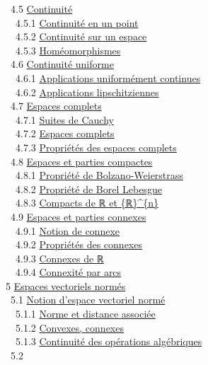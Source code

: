 \documentclass[]{article}
\begin{document}
~4.5 \href{coursse22.html\#x29-1470004.5}{Continuité} \\ ~~4.5.1
\href{coursse22.html\#x29-1480004.5.1}{Continuité en un point} \\
~~4.5.2 \href{coursse22.html\#x29-1490004.5.2}{Continuité sur un espace}
\\ ~~4.5.3 \href{coursse22.html\#x29-1500004.5.3}{Homéomorphismes} \\
~4.6 \href{coursse23.html\#x30-1510004.6}{Continuité uniforme} \\
~~4.6.1 \href{coursse23.html\#x30-1520004.6.1}{Applications uniformément
continues} \\ ~~4.6.2
\href{coursse23.html\#x30-1530004.6.2}{Applications lipschitziennes} \\
~4.7 \href{coursse24.html\#x31-1540004.7}{Espaces complets} \\ ~~4.7.1
\href{coursse24.html\#x31-1550004.7.1}{Suites de Cauchy} \\ ~~4.7.2
\href{coursse24.html\#x31-1560004.7.2}{Espaces complets} \\ ~~4.7.3
\href{coursse24.html\#x31-1570004.7.3}{Propriétés des espaces complets}
\\ ~4.8 \href{coursse25.html\#x32-1580004.8}{Espaces et parties
compactes} \\ ~~4.8.1 \href{coursse25.html\#x32-1590004.8.1}{Propriété
de Bolzano-Weierstrass} \\ ~~4.8.2
\href{coursse25.html\#x32-1600004.8.2}{Propriété de Borel Lebesgue} \\
~~4.8.3 \href{coursse25.html\#x32-1610004.8.3}{Compacts de ℝ et
\{ℝ\}\^{}\{n\}} \\ ~4.9 \href{coursse26.html\#x33-1620004.9}{Espaces et
parties connexes} \\ ~~4.9.1
\href{coursse26.html\#x33-1630004.9.1}{Notion de connexe} \\ ~~4.9.2
\href{coursse26.html\#x33-1640004.9.2}{Propriétés des connexes} \\
~~4.9.3 \href{coursse26.html\#x33-1650004.9.3}{Connexes de ℝ} \\ ~~4.9.4
\href{coursse26.html\#x33-1660004.9.4}{Connexité par arcs} \\ 5
\href{coursch6.html\#x34-1670005}{Espaces vectoriels normés} \\ ~5.1
\href{coursse27.html\#x35-1680005.1}{Notion d'espace vectoriel normé} \\
~~5.1.1 \href{coursse27.html\#x35-1690005.1.1}{Norme et distance
associée} \\ ~~5.1.2 \href{coursse27.html\#x35-1700005.1.2}{Convexes,
connexes} \\ ~~5.1.3 \href{coursse27.html\#x35-1710005.1.3}{Continuité
des opérations algébriques} \\ ~5.2
\end{document}
